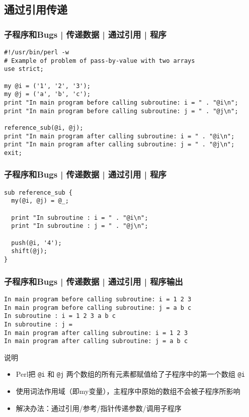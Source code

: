 \subsection{通过引用传递}
\begin{frame}[fragile]
  \frametitle{子程序和Bugs | 传递数据 | 通过引用 | 程序}
  \vspace{-0.5em}
\begin{lstlisting}[basicstyle=\small\tt]
#!/usr/bin/perl -w
# Example of problem of pass-by-value with two arrays
use strict;

my @i = ('1', '2', '3');
my @j = ('a', 'b', 'c');
print "In main program before calling subroutine: i = " . "@i\n";
print "In main program before calling subroutine: j = " . "@j\n";

reference_sub(@i, @j);
print "In main program after calling subroutine: i = " . "@i\n";
print "In main program after calling subroutine: j = " . "@j\n";
exit;
\end{lstlisting}
\end{frame}

\begin{frame}[fragile]
  \frametitle{子程序和Bugs | 传递数据 | 通过引用 | 程序}
\begin{lstlisting}
sub reference_sub {
  my(@i, @j) = @_;

  print "In subroutine : i = " . "@i\n";
  print "In subroutine : j = " . "@j\n";

  push(@i, '4');
  shift(@j);
}
\end{lstlisting}
\end{frame}

\begin{frame}[fragile]
  \frametitle{子程序和Bugs | 传递数据 | 通过引用 | 程序输出}
\begin{lstlisting}[basicstyle=\footnotesize\tt]
In main program before calling subroutine: i = 1 2 3
In main program before calling subroutine: j = a b c
In subroutine : i = 1 2 3 a b c
In subroutine : j = 
In main program after calling subroutine: i = 1 2 3
In main program after calling subroutine: j = a b c
\end{lstlisting}
\begin{block}{说明}
  \begin{itemize}
    \item Perl把 \verb|@i| 和 \verb|@j| 两个数组的所有元素都赋值给了子程序中的第一个数组 \verb|@i|
    \item 使用词法作用域（即my变量），主程序中原始的数组不会被子程序所影响
    \item 解决办法：通过引用/参考/指针传递参数/调用子程序
  \end{itemize}
\end{block}
\end{frame}

